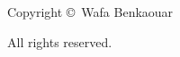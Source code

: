 \documentclass[a4paper,twoside,12pt]{book}
\begin{document}
\makeatletter\@openrightfalse
\newpage
\thispagestyle{empty}
\centering
\vspace*{\fill}
Copyright \copyright \the\year\ Wafa Benkaouar\par
All rights reserved. 
\vspace*{\fill}



\newpage
\thispagestyle{empty}
\tableofcontents
\newpage
\listoffigures
\newpage
\thispagestyle{empty}
\mbox{}

\newpage
\thispagestyle{empty}
\setcounter{page}{0}


\justifying
  
  
  
\newpage
\thispagestyle{empty}
%  
%  
%  
%  

%

%
\end{document}
